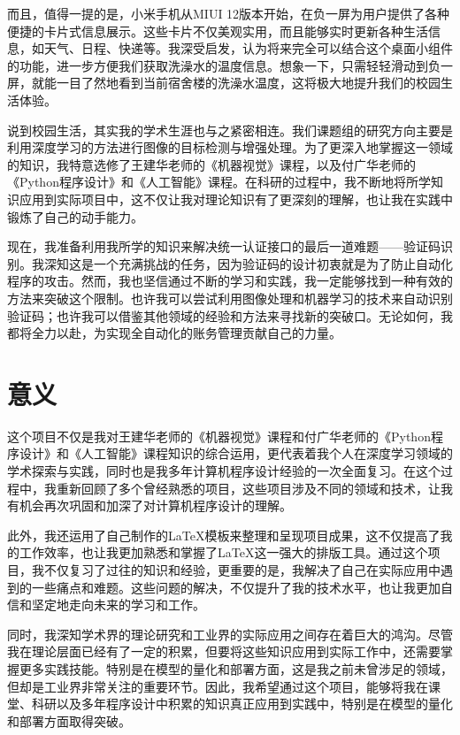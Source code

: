 而且，值得一提的是，小米手机从MIUI 12版本开始，在负一屏为用户提供了各种便捷的卡片式信息展示。这些卡片不仅美观实用，而且能够实时更新各种生活信息，如天气、日程、快递等。我深受启发，认为将来完全可以结合这个桌面小组件的功能，进一步方便我们获取洗澡水的温度信息。想象一下，只需轻轻滑动到负一屏，就能一目了然地看到当前宿舍楼的洗澡水温度，这将极大地提升我们的校园生活体验。

说到校园生活，其实我的学术生涯也与之紧密相连。我们课题组的研究方向主要是利用深度学习的方法进行图像的目标检测与增强处理。为了更深入地掌握这一领域的知识，我特意选修了王建华老师的《机器视觉》课程，以及付广华老师的《Python程序设计》和《人工智能》课程。在科研的过程中，我不断地将所学知识应用到实际项目中，这不仅让我对理论知识有了更深刻的理解，也让我在实践中锻炼了自己的动手能力。

现在，我准备利用我所学的知识来解决统一认证接口的最后一道难题——验证码识别。我深知这是一个充满挑战的任务，因为验证码的设计初衷就是为了防止自动化程序的攻击。然而，我也坚信通过不断的学习和实践，我一定能够找到一种有效的方法来突破这个限制。也许我可以尝试利用图像处理和机器学习的技术来自动识别验证码；也许我可以借鉴其他领域的经验和方法来寻找新的突破口。无论如何，我都将全力以赴，为实现全自动化的账务管理贡献自己的力量。

\section{意义}

这个项目不仅是我对王建华老师的《机器视觉》课程和付广华老师的《Python程序设计》和《人工智能》课程知识的综合运用，更代表着我个人在深度学习领域的学术探索与实践，同时也是我多年计算机程序设计经验的一次全面复习。在这个过程中，我重新回顾了多个曾经熟悉的项目，这些项目涉及不同的领域和技术，让我有机会再次巩固和加深了对计算机程序设计的理解。

此外，我还运用了自己制作的LaTeX模板来整理和呈现项目成果，这不仅提高了我的工作效率，也让我更加熟悉和掌握了LaTeX这一强大的排版工具。通过这个项目，我不仅复习了过往的知识和经验，更重要的是，我解决了自己在实际应用中遇到的一些痛点和难题。这些问题的解决，不仅提升了我的技术水平，也让我更加自信和坚定地走向未来的学习和工作。

同时，我深知学术界的理论研究和工业界的实际应用之间存在着巨大的鸿沟。尽管我在理论层面已经有了一定的积累，但要将这些知识应用到实际工作中，还需要掌握更多实践技能。特别是在模型的量化和部署方面，这是我之前未曾涉足的领域，但却是工业界非常关注的重要环节。因此，我希望通过这个项目，能够将我在课堂、科研以及多年程序设计中积累的知识真正应用到实践中，特别是在模型的量化和部署方面取得突破。

